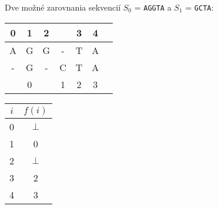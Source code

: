     \begin{example}
        Dve možné zarovnania sekvencií $S_0$ = \texttt{AGGTA} a $S_1$ =
        \texttt{GCTA}:
        
        \bigskip
        
        \begin{minipage}{2.5in}
            \begin{tabular}{ c c c c c c c }
                0 & 1 & 2 &   & 3 & 4 \\ \hline     
                A & G & G & - & T & A \\
                - & G & - & C & T & A \\ \hline
                  & 0 &   & 1 & 2 & 3 \\   
            \end{tabular}
        \end{minipage}
        \begin{minipage}{2.5in}
            \begin{tabular}{ | c | c | }
                \hline            
                $i$ & $f(i)$ \\ \hline             
                0   & $\bot$ \\ \hline 
                1   & 0      \\ \hline
                2   & $\bot$ \\ \hline
                3   & 2      \\ \hline
                4   & 3      \\ \hline
            \end{tabular}
        \end{minipage}
        
        \bigskip
        

\end{example}
